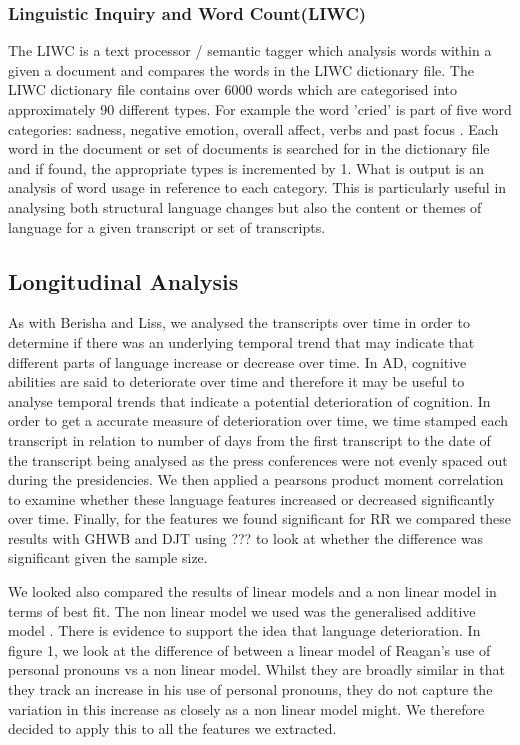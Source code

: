 \documentclass[12pt]{article}
\begin{document}
\subsubsection{Linguistic Inquiry and Word Count(LIWC)}
The LIWC is a text processor / semantic tagger which analysis words within a given a document and compares the words in the LIWC dictionary file. The LIWC dictionary file contains over 6000 words which are categorised into approximately 90 different types. For example the word 'cried' is part of five word categories: sadness, negative emotion, overall affect, verbs and past focus \cite{Pennebaker2015}. Each word in the document or set of documents is searched for in the dictionary file and if found, the appropriate types is incremented by 1. What is output is an analysis of word usage in reference to each category. This is particularly useful in analysing both structural language changes but also the content or themes of language for a given transcript or set of transcripts.

\subsection{Longitudinal Analysis}
As with Berisha and Liss\cite{Berisha2015}, we analysed the transcripts over time in order to determine if there was an underlying temporal trend that may indicate that different parts of language increase or decrease over time. In AD, cognitive abilities are said to deteriorate over time and therefore it may be useful to analyse temporal trends that indicate a potential deterioration of cognition. In order to get a accurate measure of deterioration over time, we time stamped each transcript in relation to number of days from the first transcript to the date of the transcript being analysed as the press conferences were not evenly spaced out during the presidencies. We then applied a pearsons product moment correlation to examine whether these language features increased or decreased significantly over time. Finally, for the features we found significant for RR we compared these results with GHWB and DJT using ??? to look at whether the difference was significant given the sample size. 
\par
We looked also compared the results of linear models and a non linear model in terms of best fit. The non linear model we used was the generalised additive model \cite{Hastie1986}.
There is evidence to support the idea that language deterioration. In figure 1, we look at the difference of between a linear model of Reagan's use of personal pronouns vs a non linear model. Whilst they are broadly similar in that they track an increase in his use of personal pronouns, they do not capture the variation in this increase as closely as a non linear model might. We therefore decided to apply this to all the features we extracted.
\end{document}
